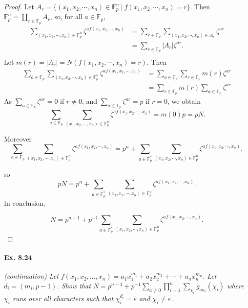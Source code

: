 \documentclass[11pt,a4paper]{article}
\begin{document}
{\begin{proof}
Let $A_r= \{(x_1,x_2,\cdots,x_n)\in\mathbb{F}_p^n \ \vert \ f(x_1,x_2,\cdots,x_n)=r\}$. Then $\mathbb{F}_p^n = \coprod\limits_{r\in\mathbb{F}_p} A_r$, so, for all $a \in \mathbb{F}_p$,
\begin{align*}
\sum\limits_{(x_1,x_2,\cdots,x_n) \in \mathbb{F}_p^n} \zeta^{af(x_1,x_2,\cdots,x_n)} 
&=\sum\limits_{r\in \mathbb{F}_p} \sum\limits_{(x_1,x_2,\cdots,x_n) \in A_r}  \zeta^{ar}\\
&=\sum\limits_{r\in \mathbb{F}_p} \vert A_r\vert \zeta^{ar}.\\
\end{align*}
Let $m(r) = \vert A_r\vert = N(f(x_1,x_2,\cdots,x_n)=r)$. Then
\begin{align*}
\sum\limits_{a\in \mathbb{F}_p} \sum\limits_{(x_1,x_2,\cdots,x_n) \in \mathbb{F}_p^n} \zeta^{af(x_1,x_2,\cdots,x_n)} &=\sum\limits_{a\in \mathbb{F}_p}\sum\limits_{r\in \mathbb{F}_p} m(r) \zeta^{ar}\\
&=\sum\limits_{r\in \mathbb{F}_p} m(r) \sum\limits_{a\in \mathbb{F}_p} \zeta^{ar}
\end{align*}
As $\sum\limits_{a\in \mathbb{F}_p} \zeta^{ar}=0$ if $r\neq 0$, and $\sum\limits_{a\in \mathbb{F}_p} \zeta^{ar} = p$ if $r=0$, we obtain
$$\sum\limits_{a\in \mathbb{F}_p} \sum\limits_{(x_1,x_2,\cdots,x_n) \in \mathbb{F}_p^n} \zeta^{af(x_1,x_2,\cdots,x_n)} = m(0) p = p N.$$

Moreover
$$\sum\limits_{a\in \mathbb{F}_p} \sum\limits_{(x_1,x_2,\cdots,x_n) \in \mathbb{F}_p^n} \zeta^{af(x_1,x_2,\cdots,x_n)} = p^n + \sum\limits_{a\in \mathbb{F}_p^*} \sum\limits_{(x_1,x_2,\cdots,x_n) \in \mathbb{F}_p^n} \zeta^{af(x_1,x_2,\cdots,x_n)},$$

so $$pN = p^n +\sum\limits_{a\in \mathbb{F}_p^*} \sum\limits_{(x_1,x_2,\cdots,x_n) \in \mathbb{F}_p^n} \zeta^{af(x_1,x_2,\cdots,x_n)}.$$  In conclusion,

$$N = p^{n-1}+p^{-1} \sum\limits_{a\in \mathbb{F}_p^*} \sum\limits_{(x_1,x_2,\cdots,x_n) \in \mathbb{F}_p^n} \zeta^{af(x_1,x_2,\cdots,x_n)}.$$
\end{proof}

\paragraph{Ex. 8.24}

{\it (continuation) Let $f(x_1,x_2,\ldots,x_n) = a_1x_1^{m_1}+a_2x_2^{m_2}+\cdots+a_n x_n^{m_n}$. Let $d_i = (m_i,p-1)$. Show that $N = p^{n-1} + p^{-1} \sum_{a\neq 0} \prod_{i=1}^n \sum_{\chi_i} g_{aa_i}(\chi_i)$ where $\chi_i$ runs over all characters such that $\chi_i^{d_i} = \varepsilon$ and $\chi_i \neq \varepsilon$.
}

}
\end{document}
